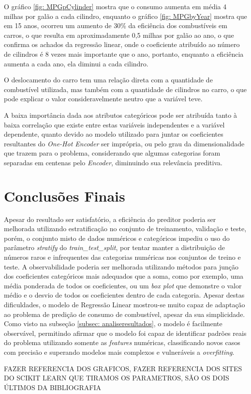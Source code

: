 \documentclass{report}
\let\oldsection\section
\renewcommand\section{\clearpage\oldsection}
\begin{document}
O gráfico \ref{fig: MPGpCylinder} mostra que o consumo aumenta em média 4 milhas por galão a cada cilindro, enquanto o gráfico \ref{fig: MPGbyYear} mostra que em 15 anos, ocorreu um aumento de 30\% da eficiência dos combustíveis em carros, o que resulta em aproximadamente 0,5 milhas por galão ao ano, o que confirma os achados da regressão linear, onde o coeficiente atribuído ao número de cilindros é 8 vezes mais importante que o ano, portanto, enquanto a eficiência aumenta a cada ano, ela diminui a cada cilindro.

O deslocamento do carro tem uma relação direta com a quantidade de combustível utilizada, mas também com a quantidade de cilindros no carro, o que pode explicar o valor consideravelmente neutro que a variável teve.

A baixa importância dada aos atributos categóricos pode ser atribuída tanto à baixa correlação que existe entre estas variáveis independentes e a variável dependente, quanto devido ao modelo utilizado para juntar os coeficientes resultantes do \textit{One-Hot Encoder} ser imprópria, ou pelo grau da dimensionalidade que trazem para o problema, considerando que algumas categorias foram separadas em centenas pelo \textit{Encoder}, diminuindo sua relevância preditiva.
\section{Conclusões Finais}
Apesar do resultado ser satisfatório, a eficiência do preditor poderia ser melhorada utilizando estratificação no conjunto de treinamento, validação e teste, porém, o conjunto misto de dados numéricos e categóricos impediu o uso do parâmetro \textit{stratify} do \textit{train\_test\_split}, por tentar manter a distribuição de números raros e infrequentes das categorias numéricas nos conjuntos de treino e teste. A observabilidade poderia ser melhorada utilizando métodos para junção dos coeficientes categóricos mais adequados que a soma, como por exemplo, uma média ponderada de todos os coeficientes, ou um \textit{box plot} que demonstre o valor médio e o desvio de todos os coeficientes dentro de cada categoria.
Apesar destas dificuldades, o modelo de Regressão Linear mostrou-se muito capaz de adaptação ao problema de predição de consumo de combustível, apesar da sua simplicidade. Como visto na subseção \ref{subsec: analiseresultados}, o modelo é facilmente observável, permitindo afirmar que o modelo foi capaz de identificar padrões reais do problema utilizando somente as \textit{features} numéricas, classificando novos casos com precisão e superando modelos mais complexos e vulneráveis a \textit{overfitting}.


FAZER REFERENCIA DOS GRAFICOS, %
FAZER REFERENCIA DOS SITES DO SCIKIT LEARN QUE TIRAMOS OS PARAMETROS, SÃO OS DOIS ÚLTIMOS DA BIBLIOGRAFIA 


\clearpage
\printbibliography
\thispagestyle{empty}
\end{document}
